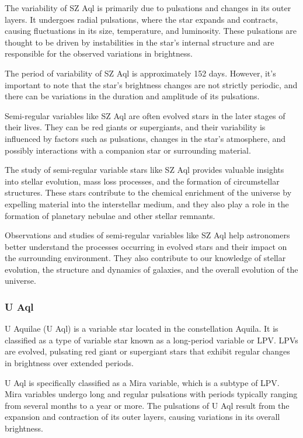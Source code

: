 The variability of SZ Aql is primarily due to pulsations and changes in its outer layers. It undergoes radial pulsations, where the star expands and contracts, causing fluctuations in its size, temperature, and luminosity. These pulsations are thought to be driven by instabilities in the star's internal structure and are responsible for the observed variations in brightness.

The period of variability of SZ Aql is approximately 152 days. However, it's important to note that the star's brightness changes are not strictly periodic, and there can be variations in the duration and amplitude of its pulsations.

Semi-regular variables like SZ Aql are often evolved stars in the later stages of their lives. They can be red giants or supergiants, and their variability is influenced by factors such as pulsations, changes in the star's atmosphere, and possibly interactions with a companion star or surrounding material.

The study of semi-regular variable stars like SZ Aql provides valuable insights into stellar evolution, mass loss processes, and the formation of circumstellar structures. These stars contribute to the chemical enrichment of the universe by expelling material into the interstellar medium, and they also play a role in the formation of planetary nebulae and other stellar remnants.

Observations and studies of semi-regular variables like SZ Aql help astronomers better understand the processes occurring in evolved stars and their impact on the surrounding environment. They also contribute to our knowledge of stellar evolution, the structure and dynamics of galaxies, and the overall evolution of the universe.


\subsubsection*{ U Aql }
U Aquilae (U Aql) is a variable star located in the constellation Aquila. It is classified as a type of variable star known as a long-period variable or LPV. LPVs are evolved, pulsating red giant or supergiant stars that exhibit regular changes in brightness over extended periods.

U Aql is specifically classified as a Mira variable, which is a subtype of LPV. Mira variables undergo long and regular pulsations with periods typically ranging from several months to a year or more. The pulsations of U Aql result from the expansion and contraction of its outer layers, causing variations in its overall brightness.

